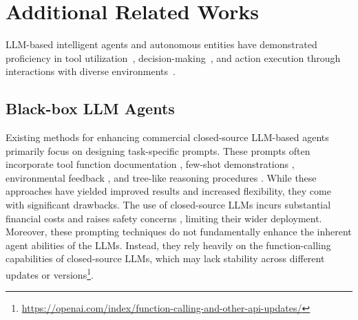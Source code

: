 \section{Additional Related Works}
\label{app:related works}
LLM-based intelligent agents and autonomous entities have demonstrated proficiency in tool utilization~\cite{qin2023toolllm,zhuang2024toolqa}, decision-making~\cite{wang2023voyager,li2024matryoshka}, and action execution through interactions with diverse environments~\cite{sun2024adaplanner,shi2024ehragent}. 

% 

\subsection{Black-box LLM Agents}
Existing methods for enhancing commercial closed-source LLM-based agents primarily focus on designing task-specific prompts. These prompts often incorporate tool function documentation \citep{hsieh2023tool}, few-shot demonstrations \citep{lu2024chameleon}, environmental feedback \citep{yao2022react, sun2024adaplanner, wang2023voyager}, and tree-like reasoning procedures \citep{yao2024tree, zhuang2023toolchain}. While these approaches have yielded improved results and increased flexibility, they come with significant drawbacks. The use of closed-source LLMs incurs substantial financial costs and raises safety concerns \citep{li2023multi,zhuang2024hydra, yuan2023gpt,sun2024bbox,shi2024medadapter}, limiting their wider deployment. Moreover, these prompting techniques do not fundamentally enhance the inherent agent abilities of the LLMs. Instead, they rely heavily on the function-calling capabilities of closed-source LLMs, which may lack stability across different updates or versions\footnote{\url{https://openai.com/index/function-calling-and-other-api-updates/}}.


